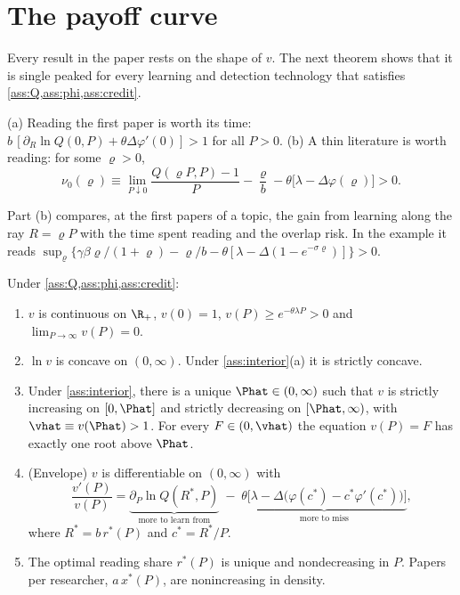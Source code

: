 \section{The payoff curve}\label{sec:payoff}

Every result in the paper rests on the shape of $v$. The next theorem shows
that it is single peaked for every learning and detection technology that
satisfies \cref{ass:Q,ass:phi,ass:credit}.

\begin{assumption}\label{ass:interior}
(a) Reading the first paper is worth its time: $b\,[\partial_R\ln Q(0,P)+\theta\Delta\varphi'(0)]>1$ for all $P>0$.
(b) A thin literature is worth reading: for some $\varrho>0$,
\[
\nu_0(\varrho)\equiv\lim_{P\downarrow 0}\frac{Q(\varrho P,P)-1}{P}-\frac{\varrho}{b}-\theta\big[\lambda-\Delta\varphi(\varrho)\big]>0.
\]
\end{assumption}

Part (b) compares, at the first papers of a topic, the gain from learning along the
ray $R=\varrho P$ with the time spent reading and the overlap risk. In the
example it reads $\sup_\varrho\{\gamma\beta\varrho/(1+\varrho)-\varrho/b-\theta[\lambda-\Delta(1-e^{-\sigma\varrho})]\}>0$.

\begin{theorem}\label{thm:v}
Under \cref{ass:Q,ass:phi,ass:credit}:
\begin{enumerate}[label=(\roman*)]
\item $v$ is continuous on $\R_+$, $v(0)=1$, $v(P)\ge e^{-\theta\lambda P}>0$ and $\lim_{P\to\infty}v(P)=0$.
\item $\ln v$ is concave on $(0,\infty)$. Under \cref{ass:interior}(a) it is strictly concave.
\item Under \cref{ass:interior}, there is a unique $\Phat\in(0,\infty)$ such that $v$ is strictly increasing on $[0,\Phat]$ and strictly decreasing on $[\Phat,\infty)$, with $\vhat\equiv v(\Phat)>1$. For every $F\in(0,\vhat)$ the equation $v(P)=F$ has exactly one root above $\Phat$.
\item (Envelope) $v$ is differentiable on $(0,\infty)$ with
\begin{equation}\label{eq:envelope}
\frac{v'(P)}{v(P)}=\underbrace{\partial_P\ln Q(R^*,P)}_{\text{more to learn from}}\;-\;\underbrace{\theta\big[\lambda-\Delta\big(\varphi(c^*)-c^*\varphi'(c^*)\big)\big]}_{\text{more to miss}},
\end{equation}
where $R^*=b\,r^*(P)$ and $c^*=R^*/P$.
\item The optimal reading share $r^*(P)$ is unique and nondecreasing in $P$. Papers per researcher, $a\,x^*(P)$, are nonincreasing in density.
\end{enumerate}
\end{theorem}

